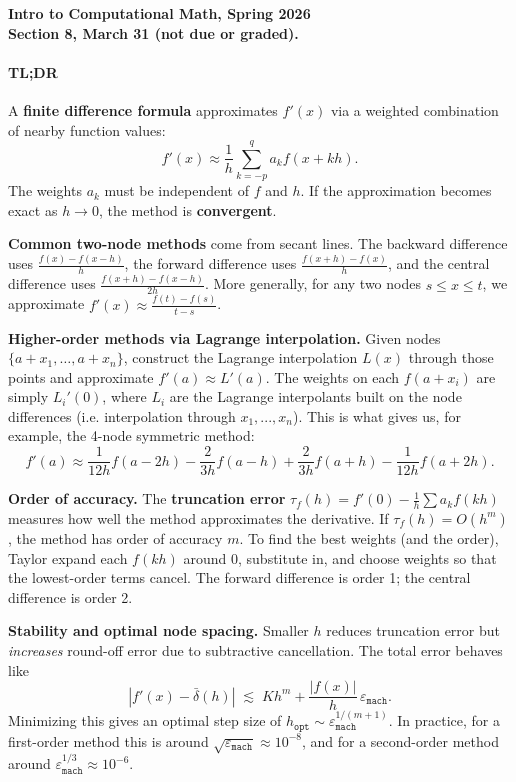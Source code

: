 \documentclass[11pt]{article}
\begin{document}
\begin{center}
{\bf Intro to Computational Math, Spring 2026\\
Section 8, March 31 (not due or graded).\\
}
\end{center}

\paragraph{TL;DR}
 
A \textbf{finite difference formula} approximates $f'(x)$ via a weighted combination of nearby function values:
$$f'(x) \approx \frac{1}{h}\sum_{k=-p}^q a_kf(x+kh).$$
The weights $a_k$ must be independent of $f$ and $h$. If the approximation becomes exact as $h \to 0$, the method is \textbf{convergent}.
 
\medskip
\noindent\textbf{Common two-node methods} come from secant lines. The backward difference uses $\frac{f(x)-f(x-h)}{h}$, the forward difference uses $\frac{f(x+h)-f(x)}{h}$, and the central difference uses $\frac{f(x+h)-f(x-h)}{2h}$. More generally, for any two nodes $s \leq x \leq t$, we approximate $f'(x) \approx \frac{f(t)-f(s)}{t-s}$.
 
\medskip
\noindent\textbf{Higher-order methods via Lagrange interpolation.} Given nodes $\{a+x_1, \ldots, a+x_n\}$, construct the Lagrange interpolation $L(x)$ through those points and approximate $f'(a) \approx L'(a)$. The weights on each $f(a+x_i)$ are simply $L_i'(0)$, where $L_i$ are the Lagrange interpolants built on the node differences  (i.e. interpolation through $x_1, ..., x_n$). This is what gives us, for example, the 4-node symmetric method:
$$f'(a) \approx \frac{1}{12h}f(a-2h) - \frac{2}{3h}f(a-h) + \frac{2}{3h}f(a+h) - \frac{1}{12h}f(a+2h).$$
 
\medskip
\noindent\textbf{Order of accuracy.} The \textbf{truncation error} $\tau_f(h) = f'(0) - \frac{1}{h}\sum a_k f(kh)$ measures how well the method approximates the derivative. If $\tau_f(h) = O(h^m)$, the method has order of accuracy $m$. To find the best weights (and the order), Taylor expand each $f(kh)$ around $0$, substitute in, and choose weights so that the lowest-order terms cancel. The forward difference is order 1; the central difference is order 2.
 
\medskip
\noindent\textbf{Stability and optimal node spacing.} Smaller $h$ reduces truncation error but \emph{increases} round-off error due to subtractive cancellation. The total error behaves like
$$|f'(x) - \bar{\delta}(h)| \;\lesssim\; Kh^m + \frac{|f(x)|}{h}\,\varepsilon_{\mathtt{mach}}.$$
Minimizing this gives an optimal step size of $h_{\mathtt{opt}} \sim \varepsilon_{\mathtt{mach}}^{1/(m+1)}$. In practice, for a first-order method this is around $\sqrt{\varepsilon_{\mathtt{mach}}} \approx 10^{-8}$, and for a second-order method around $\varepsilon_{\mathtt{mach}}^{1/3} \approx 10^{-6}$.
\end{document}
